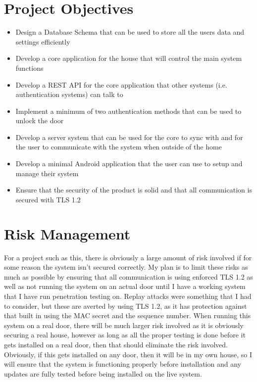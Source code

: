 \cite{Lackner2013}

\section{Project Objectives}
\begin{itemize}
	\item Design a Database Schema that can be used to store all the users data and settings efficiently
	\item Develop a core application for the house that will control the main system functions
	\item Develop a REST API for the core application that other systems (i.e. authentication systems) can talk to
	\item Implement a minimum of two authentication methods that can be used to unlock the door
	\item Develop a server system that can be used for the core to sync with and for the user to communicate with the system when outside of the home
	\item Develop a minimal Android application that the user can use to setup and manage their system
	\item Ensure that the security of the product is solid and that all communication is secured with TLS 1.2
\end{itemize}

\section{Risk Management}
For a project such as this, there is obviously a large amount of risk involved if for some reason the system isn't secured correctly. My plan is to limit these risks as much as possible by ensuring that all communication is using enforced TLS 1.2 as well as not running the system on an actual door until I have a working system that I have run penetration testing on. Replay attacks were something that I had to consider, but these are averted by using TLS 1.2, as it has protection against that built in using the MAC secret and the sequence number. When running this system on a real door, there will be much larger risk involved as it is obviously securing a real house, however as long as all the proper testing is done before it gets installed on a real door, then that should eliminate the risk involved. Obviously, if this gets installed on any door, then it will be in my own house, so I will ensure that the system is functioning properly before installation and any updates are fully tested before being installed on the live system.

